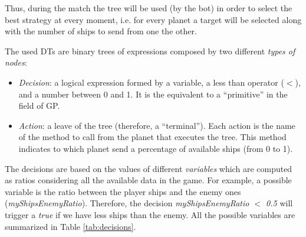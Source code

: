 \documentclass[preprint]{elsarticle}
\begin{document}
Thus, during the match the tree will be used (by the bot) in order to select the best strategy at every moment, i.e. for every planet a target will be selected along with the number of ships to send from one the other.

\noindent The used DTs are binary trees of expressions composed by two different \textit{types of nodes}:

\begin{itemize}
\item {\em Decision}: a logical expression formed by a variable, a less than operator ($<$), and a number between 0 and 1. It is the equivalent to a ``primitive'' in the field of GP.
\item {\em Action}: a leave of the tree (therefore, a ``terminal''). Each action is the name of the method to call from the planet that executes the tree. This method indicates to which planet send a percentage of available ships (from 0 to 1). 
\end{itemize}

The decisions are based on the values of different \textit{variables} which are computed as ratios considering all the available data in the game. For example, a possible variable is the ratio between the player ships and the enemy ones ({\em myShipsEnemyRatio}). Therefore, the decision \textit{myShipsEnemyRatio $<$ 0.5} will trigger a \textit{true} if we have less ships than the enemy. All the possible variables are summarized in Table \ref{tab:decisions}.


\begin{table}
\caption{Possible decisions in a generated tree.}
\label{tab:decisions}
\end{table}
\end{document}
